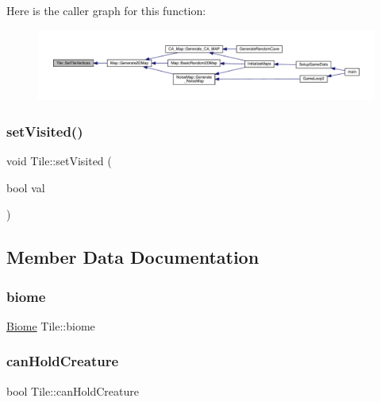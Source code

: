 Here is the caller graph for this function\+:
\nopagebreak
\begin{figure}[H]
\begin{center}
\leavevmode
\includegraphics[width=350pt]{class_tile_ae04b87313b96914391ca2ffc2eb9f5c1_icgraph}
\end{center}
\end{figure}
\mbox{\label{class_tile_a72c64bbb075c641ed1af3b4d669d39ea}} 
\subsubsection{\texorpdfstring{set\+Visited()}{setVisited()}}
{\footnotesize\ttfamily void Tile\+::set\+Visited (\begin{DoxyParamCaption}\item[{bool}]{val }\end{DoxyParamCaption})}



\subsection{Member Data Documentation}
\mbox{\label{class_tile_aaaecf4c66080aa56274a50e6a1e3507f}} 
\subsubsection{\texorpdfstring{biome}{biome}}
{\footnotesize\ttfamily \mbox{\hyperlink{class_biome}{Biome}} Tile\+::biome\hspace{0.3cm}{\ttfamily [private]}}

\mbox{\label{class_tile_acacf4fe2349698e47f060d5301f7ba93}} 
\subsubsection{\texorpdfstring{can\+Hold\+Creature}{canHoldCreature}}
{\footnotesize\ttfamily bool Tile\+::can\+Hold\+Creature\hspace{0.3cm}{\ttfamily [private]}}

